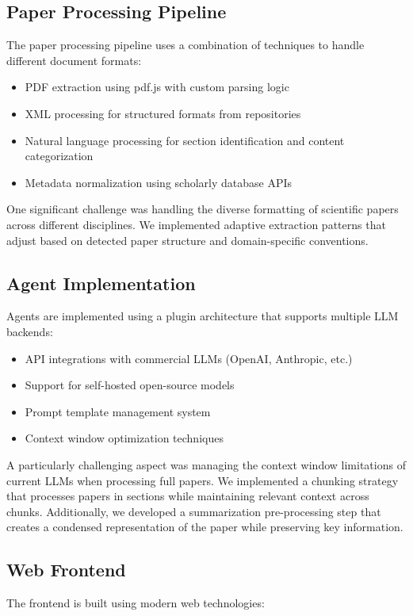 \documentclass[conference]{IEEEtran}
\begin{document}
\subsection{Paper Processing Pipeline}
The paper processing pipeline uses a combination of techniques to handle different document formats:

\begin{itemize}
    \item PDF extraction using pdf.js with custom parsing logic
    \item XML processing for structured formats from repositories
    \item Natural language processing for section identification and content categorization
    \item Metadata normalization using scholarly database APIs
\end{itemize}

One significant challenge was handling the diverse formatting of scientific papers across different disciplines. We implemented adaptive extraction patterns that adjust based on detected paper structure and domain-specific conventions.

\subsection{Agent Implementation}
Agents are implemented using a plugin architecture that supports multiple LLM backends:

\begin{itemize}
    \item API integrations with commercial LLMs (OpenAI, Anthropic, etc.)
    \item Support for self-hosted open-source models
    \item Prompt template management system
    \item Context window optimization techniques
\end{itemize}

A particularly challenging aspect was managing the context window limitations of current LLMs when processing full papers. We implemented a chunking strategy that processes papers in sections while maintaining relevant context across chunks. Additionally, we developed a summarization pre-processing step that creates a condensed representation of the paper while preserving key information.

\subsection{Web Frontend}
The frontend is built using modern web technologies:
\end{document}
